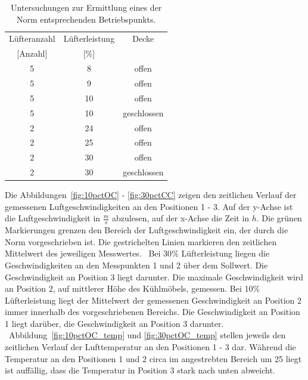 \begin{table}[h!]
\centering
\caption{Untersuchungen zur Ermittlung eines der Norm entsprechenden Betriebspunkts.}
\label{tab:Lüfterleistungen}
\begin{tabular}{|ccc|}
\hline
Lüfteranzahl            & Lüfterleistung          & Decke       \\
{[}Anzahl{]}            & {[}\%{]}                &             \\ \hline
\multicolumn{1}{|c|}{5} & \multicolumn{1}{c|}{8}  & offen       \\
\multicolumn{1}{|c|}{5} & \multicolumn{1}{c|}{9}  & offen       \\
\multicolumn{1}{|c|}{5} & \multicolumn{1}{c|}{10} & offen       \\
\multicolumn{1}{|c|}{5} & \multicolumn{1}{c|}{10} & geschlossen \\
\multicolumn{1}{|c|}{2} & \multicolumn{1}{c|}{24} & offen       \\
\multicolumn{1}{|c|}{2} & \multicolumn{1}{c|}{25} & offen       \\
\multicolumn{1}{|c|}{2} & \multicolumn{1}{c|}{30} & offen       \\
\multicolumn{1}{|c|}{2} & \multicolumn{1}{c|}{30} & geschlossen \\ \hline
\end{tabular}
\end{table}

Die Abbildungen~\ref{fig:10pctOC} - \ref{fig:30pctCC} zeigen den zeitlichen Verlauf der gemessenen Luftgeschwindigkeiten an den Positionen 1 - 3. Auf der y-Achse ist die Luftgeschwindigkeit in $\frac{m}{s}$ abzulesen, auf der x-Achse die Zeit in $h$. Die grünen Markierungen grenzen den Bereich der Luftgeschwindigkeit ein, der durch die Norm vorgeschrieben ist. Die gestrichelten Linien markieren den zeitlichen Mittelwert des jeweiligen Messwertes. \
Bei \unit{30}{\%} Lüfterleistung liegen die Geschwindigkeiten an den Messpunkten 1 und 2 über dem Sollwert. Die Geschwindigkeit an Position 3 liegt darunter. Die maximale Geschwindigkeit wird an Position 2, auf mittlerer Höhe des Kühlmöbels, gemessen.
Bei \unit{10}{\%} Lüfterleistung liegt der Mittelwert der gemessenen Geschwindigkeit an Position 2 immer innerhalb des vorgeschriebenen Bereichs. Die Geschwindigkeit an Position 1 liegt darüber, die Geschwindigkeit an Position 3 darunter. \
Abbildung~\ref{fig:10pctOC_temp} und \ref{fig:30pctOC_temp} stellen jeweils den zeitlichen Verlauf der Lufttemperatur an den Positionen 1 - 3 dar.
Während die Temperatur an den Positionen 1 und 2 circa im angestrebten Bereich um \unit{25}{\celsius} liegt ist auffällig, dass die Temperatur in Position 3 stark nach unten abweicht.\

